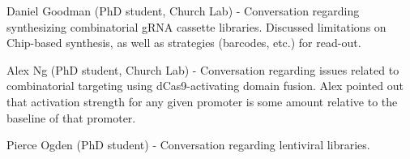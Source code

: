 \documentclass[10pt]{article}
\begin{document}
\noindent Daniel Goodman (PhD student, Church Lab) - Conversation regarding synthesizing combinatorial gRNA cassette libraries. Discussed limitations on Chip-based synthesis, as well as strategies (barcodes, etc.) for read-out.
\newline

\noindent Alex Ng (PhD student, Church Lab) - Conversation regarding issues related to combinatorial targeting using dCas9-activating domain fusion. Alex pointed out that activation strength for any given promoter is some amount relative to the baseline of that promoter.
\newline

\noindent Pierce Ogden (PhD student) - Conversation regarding lentiviral libraries.
\end{document}
